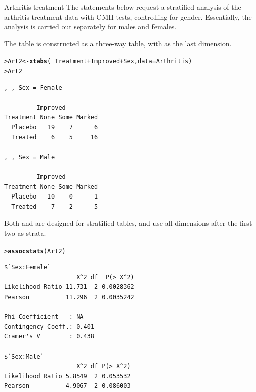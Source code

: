 \documentclass[10pt,krantz2]{krantz}\usepackage[]{graphicx}\usepackage[]{color}
\makeatletter
\newcommand{\hlopt}[1]{\textcolor[rgb]{0,0,0}{#1}}%
\newcommand{\hlstd}[1]{\textcolor[rgb]{0.345,0.345,0.345}{#1}}%
\newcommand{\hlkwb}[1]{\textcolor[rgb]{0.69,0.353,0.396}{#1}}%
\newcommand{\hlkwc}[1]{\textcolor[rgb]{0.333,0.667,0.333}{#1}}%
\newcommand{\hlkwd}[1]{\textcolor[rgb]{0.737,0.353,0.396}{\textbf{#1}}}%
\newenvironment{kframe}{%
 \def\at@end@of@kframe{}%
 \ifinner\ifhmode%
  \def\at@end@of@kframe{\end{minipage}}%
  \begin{minipage}{\columnwidth}%
 \fi\fi%
 \def\FrameCommand##1{\hskip\@totalleftmargin \hskip-\fboxsep
 \colorbox{shadecolor}{##1}\hskip-\fboxsep
     \hskip-\linewidth \hskip-\@totalleftmargin \hskip\columnwidth}%
 \MakeFramed {\advance\hsize-\width
   \@totalleftmargin\z@ \linewidth\hsize
   \@setminipage}}%
 {\par\unskip\endMakeFramed%
 \at@end@of@kframe}
\newenvironment{knitrout}{}{} %
\renewenvironment{knitrout}{\small\renewcommand{\baselinestretch}{.85}}{} %
\makeatother
\begin{document}
\begin{Example}[arthrit3]{Arthritis treatment}
The statements below request a stratified analysis of the arthritis
treatment data
with CMH tests,
controlling for gender.  Essentially, the analysis is carried out
separately for males and females.

The table  is constructed as a three-way table,
with  as the last dimension.
\begin{knitrout}
\color{fgcolor}\begin{kframe}
\begin{alltt}
\hlstd{> }\hlstd{Art2} \hlkwb{<-} \hlkwd{xtabs}\hlstd{(}\hlopt{~} \hlstd{Treatment} \hlopt{+} \hlstd{Improved} \hlopt{+} \hlstd{Sex,} \hlkwc{data} \hlstd{= Arthritis)}
\hlstd{> }\hlstd{Art2}
\end{alltt}
\begin{verbatim}
, , Sex = Female

         Improved
Treatment None Some Marked
  Placebo   19    7      6
  Treated    6    5     16

, , Sex = Male

         Improved
Treatment None Some Marked
  Placebo   10    0      1
  Treated    7    2      5
\end{verbatim}
\end{kframe}
\end{knitrout}
Both  and  are 
designed for stratified tables, and
use all dimensions after the first two as strata.
\begin{knitrout}
\color{fgcolor}\begin{kframe}
\begin{alltt}
\hlstd{> }\hlkwd{assocstats}\hlstd{(Art2)}
\end{alltt}
\begin{verbatim}
$`Sex:Female`
                    X^2 df  P(> X^2)
Likelihood Ratio 11.731  2 0.0028362
Pearson          11.296  2 0.0035242

Phi-Coefficient   : NA 
Contingency Coeff.: 0.401 
Cramer's V        : 0.438 

$`Sex:Male`
                    X^2 df P(> X^2)
Likelihood Ratio 5.8549  2 0.053532
Pearson          4.9067  2 0.086003


\end{verbatim}
\end{kframe}
\end{knitrout}
\end{Example}
\end{document}
